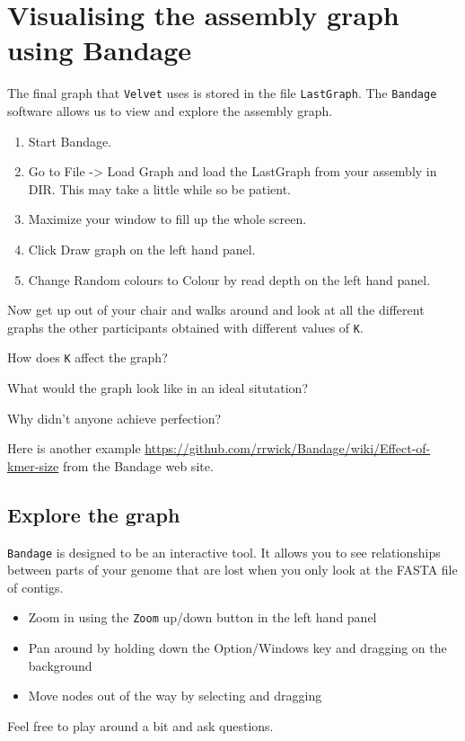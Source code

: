 \section{Visualising the assembly graph using Bandage}

The final graph that \texttt{Velvet} uses is stored in the file \texttt{LastGraph}. The \texttt{Bandage} software allows us to view and explore the assembly graph.
\begin{steps}
\begin{enumerate}
\item Start Bandage.
\item Go to File -> Load Graph and load the LastGraph from your assembly in DIR. This may take a little while so be patient.
\item Maximize your window to fill up the whole screen.
\item Click Draw graph on the left hand panel.
\item Change Random colours to Colour by read depth on the left hand panel.
\end{enumerate}
\end{steps}

Now get up out of your chair and walks around and look at all the different graphs the other participants obtained with different values of \texttt{K}.
\begin{questions}
How does \texttt{K} affect the graph?
\begin{answer}
\end{answer}
What would the graph look like in an ideal situtation?
\begin{answer}
\end{answer}
Why didn't anyone achieve perfection?
\begin{answer}
\end{answer}
\end{questions}

Here is another example \url{https://github.com/rrwick/Bandage/wiki/Effect-of-kmer-size} from the Bandage web site. %

\subsection{Explore the graph}

\texttt{Bandage} is designed to be an interactive tool. It allows you to see relationships between parts of your genome that are lost when you only look at the FASTA file of contigs.
\begin{itemize}
\item Zoom in using the \texttt{Zoom} up/down button in the left hand panel
\item Pan around by holding down the Option/Windows key and dragging on the background
\item Move nodes out of the way by selecting and dragging
\end{itemize}
Feel free to play around a bit and ask questions.

